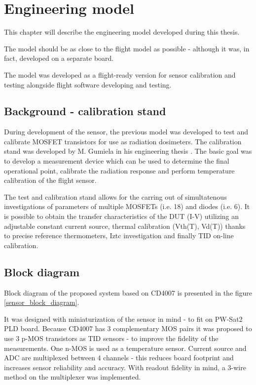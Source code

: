 \chapter{Engineering model}
\label{Engineering_model_chapter}
This chapter will describe the engineering model developed during this thesis.

The model should be as close to the flight model as possible - although it was, in fact, developed on a separate board.

The model was developed as a flight-ready version for sensor calibration and testing alongside flight software developing and testing.

\section{Background - calibration stand}
    During development of the sensor, the previous model was developed to test and calibrate MOSFET transistors for use as radiation dosimeters. The calibration stand was developed by M. Gumiela in his engineering thesis \cite{MGThesis}. The basic goal was to develop a measurement device which can be used to determine the final operational point, calibrate the radiation response and perform temperature calibration of the flight sensor.

    The test and calibration stand allows for the carring out of simultatenous investigations of parameters of multiple MOSFETs (i.e. 18) and diodes (i.e. 6). It is possible to obtain the transfer characteristics of the DUT (I-V) utilizing an adjustable constant current source, thermal calibration (Vth(T), Vd(T)) thanks to precise reference thermometers, Iztc investigation and finally TID on-line calibration.


\section{Block diagram}
    Block diagram of the proposed system based on CD4007 is presented in the figure \ref{sensor_block_diagram}.

    It was designed with miniaturization of the sensor in mind - to fit on PW-Sat2 PLD board. Because CD4007 has 3 complementary MOS pairs it was proposed to use 3 p-MOS transistors as TID sensors - to improve the fidelity of the measurements. One n-MOS is used as a temperature sensor. Current source and ADC are multiplexed between 4 channels - this reduces board footprint and increases sensor reliability and accuracy. With readout fidelity in mind, a 3-wire method on the multiplexer was implemented.

